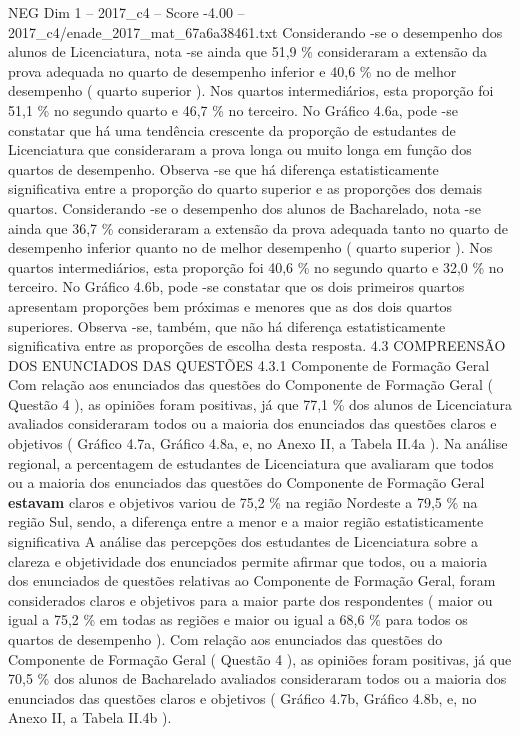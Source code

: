 \begin{textsample}{NEG Dim 1 – 2017\_c4 – Score -4.00 – 2017\_c4/enade\_2017\_mat\_67a6a38461.txt}
Considerando -se o desempenho dos alunos de Licenciatura, nota -se ainda que 51,9 \% consideraram a extensão da prova adequada no quarto de desempenho inferior e 40,6 \% no de melhor desempenho ( quarto superior ).
Nos quartos intermediários, esta proporção foi 51,1 \% no segundo quarto e 46,7 \% no terceiro.
No Gráfico 4.6a, pode -se constatar que há uma tendência crescente da proporção de estudantes de Licenciatura que consideraram a prova longa ou muito longa em função dos quartos de desempenho.
Observa -se que há diferença estatisticamente significativa entre a proporção do quarto superior e as proporções dos demais quartos.
Considerando -se o desempenho dos alunos de Bacharelado, nota -se ainda que 36,7 \% consideraram a extensão da prova adequada tanto no quarto de desempenho inferior quanto no de melhor desempenho ( quarto superior ).
Nos quartos intermediários, esta proporção foi 40,6 \% no segundo quarto e 32,0 \% no terceiro.
No Gráfico 4.6b, pode -se constatar que os dois primeiros quartos apresentam proporções bem próximas e menores que as dos dois quartos superiores.
Observa -se, também, que não há diferença estatisticamente significativa entre as proporções de escolha desta resposta. 4.3 COMPREENSÃO DOS ENUNCIADOS DAS QUESTÕES 4.3.1 Componente de Formação Geral Com relação aos enunciados das questões do Componente de Formação Geral ( Questão 4 ), as opiniões foram positivas, já que 77,1 \% dos alunos de Licenciatura avaliados consideraram todos ou a maioria dos enunciados das questões claros e objetivos ( Gráfico 4.7a, Gráfico 4.8a, e, no Anexo II, a Tabela II.4a ).
Na análise regional, a percentagem de estudantes de Licenciatura que avaliaram que todos ou a maioria dos enunciados das questões do Componente de Formação Geral \textbf{estavam} claros e objetivos variou de 75,2 \% na região Nordeste a 79,5 \% na região Sul, sendo, a diferença entre a menor e a maior região estatisticamente significativa A análise das percepções dos estudantes de Licenciatura sobre a clareza e objetividade dos enunciados permite afirmar que todos, ou a maioria dos enunciados de questões relativas ao Componente de Formação Geral, foram considerados claros e objetivos para a maior parte dos respondentes ( maior ou igual a 75,2 \% em todas as regiões e maior ou igual a 68,6 \% para todos os quartos de desempenho ).
Com relação aos enunciados das questões do Componente de Formação Geral ( Questão 4 ), as opiniões foram positivas, já que 70,5 \% dos alunos de Bacharelado avaliados consideraram todos ou a maioria dos enunciados das questões claros e objetivos ( Gráfico 4.7b, Gráfico 4.8b, e, no Anexo II, a Tabela II.4b ).

\end{textsample}
